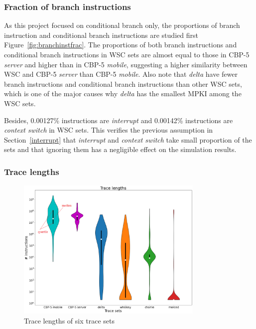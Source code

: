 \subsubsection{Fraction of branch instructions}

As this project focused on conditional branch only, the proportions of branch instruction and conditional branch instructions are studied first Figure~\ref{fig:branchinstfrac}. The proportions of both branch instructions and conditional branch instructions in WSC sets are almost equal to those in CBP-5 \textit{server} and higher than in CBP-5 \textit{mobile}, suggesting a higher similarity between WSC and CBP-5 \textit{server} than CBP-5 \textit{mobile}. Also note that \textit{delta} have fewer branch instructions and conditional branch instructions than other WSC sets, which is one of the major causes why \textit{delta} has the smallest MPKI among the WSC sets. \par\hspace*{\fill}\par



Besides, 0.00127\% instructions are \textit{interrupt} and 0.00142\% instructions are \textit{context switch} in WSC sets.
This verifies the previous assumption in Section~\ref{interrupt} that \textit{interrupt} and \textit{context switch} take small proportion of the sets and that ignoring them has a negligible effect on the simulation results.
\label{frantion of interrupt}

\subsubsection{Trace lengths}

\begin{figure}[h!] 
\centering    
\includegraphics[width=0.8\textwidth]{Chapter3/Figs/tracelength.png}
\caption{\centering Trace lengths of six trace sets}
\label{fig:tracelength}
\end{figure} %

